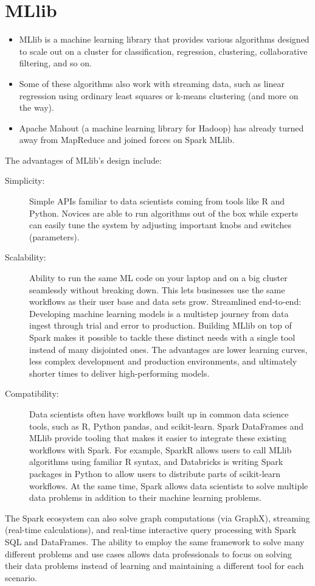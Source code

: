 \documentclass[a4paper,12pt]{article}
\begin{document}
\section*{MLlib}

\begin{itemize}
\item  MLlib is a machine learning library that provides various algorithms designed to scale out on a cluster for classification, regression, clustering, collaborative filtering, and so on. 
\item Some of these algorithms also work with streaming data, such as linear regression using ordinary least squares or k-means clustering (and more on the way). 
\item Apache Mahout (a machine learning library for Hadoop) has already turned away from MapReduce and joined forces on Spark MLlib.
\end{itemize}
\newpage

The advantages of MLlib’s design include:
\begin{description}
\item[Simplicity:] Simple APIs familiar to data scientists coming from tools like R and Python. Novices are able to run 
algorithms out of the box while experts can easily tune the system by adjusting important knobs and switches (parameters).

\item[Scalability:] Ability to run the same ML code on your laptop and on a big cluster seamlessly without breaking down. 
This lets businesses use the same workflows as their user base and data sets grow.
Streamlined end-to-end: Developing machine learning models is a multistep journey from data ingest through trial 
and error to production. Building MLlib on top of Spark makes it possible to tackle these distinct needs with a 
single tool instead of many disjointed ones. The advantages are lower learning curves, less complex development 
and production environments, and ultimately shorter times to deliver high-performing models.

\item[Compatibility:] Data scientists often have workflows built up in common data science tools, such as R, Python pandas, and 
scikit-learn. Spark DataFrames and MLlib provide tooling that makes it easier to integrate these existing workflows with 
Spark. For example, SparkR allows users to call MLlib algorithms using familiar R syntax, and Databricks is writing 
Spark packages in Python to allow users to distribute parts of scikit-learn workflows.
At the same time, Spark allows data scientists to solve multiple data problems in addition to their machine learning problems. 
\end{description}
The Spark ecosystem can also solve graph computations (via GraphX), streaming (real-time calculations), and real-time 
interactive query processing with Spark SQL and DataFrames. The ability to employ the same framework to solve many 
different problems and use cases allows data professionals to focus on solving their data problems instead of 
learning and maintaining a different 
tool for each scenario.
\end{document}
